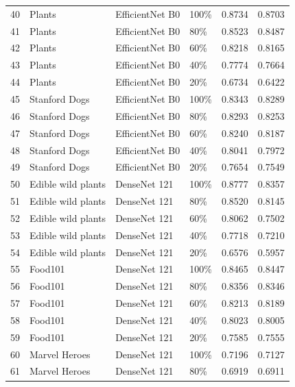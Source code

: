 \begin{longtable}{|l|l|l|l|r|r|}
40 &     Plants &  EfficientNet B0 &       100\% &  0.8734 &  0.8703 \\
41 &     Plants &  EfficientNet B0 &        80\% &  0.8523 &  0.8487 \\
42 &     Plants &  EfficientNet B0 &        60\% &  0.8218 &  0.8165 \\
43 &     Plants &  EfficientNet B0 &        40\% &  0.7774 &  0.7664 \\
44 &     Plants &  EfficientNet B0 &        20\% &  0.6734 &  0.6422 \\\hline
45 &  Stanford Dogs &  EfficientNet B0 &       100\% &  0.8343 &  0.8289 \\
46 &  Stanford Dogs &  EfficientNet B0 &        80\% &  0.8293 &  0.8253 \\
47 &  Stanford Dogs &  EfficientNet B0 &        60\% &  0.8240 &  0.8187 \\
48 &  Stanford Dogs &  EfficientNet B0 &        40\% &  0.8041 &  0.7972 \\
49 &  Stanford Dogs &  EfficientNet B0 &        20\% &  0.7654 &  0.7549 \\\hline
50 &  Edible wild plants &      DenseNet 121 &       100\% &  0.8777 &  0.8357 \\
51 &  Edible wild plants &      DenseNet 121 &        80\% &  0.8520 &  0.8145 \\
52 &  Edible wild plants &      DenseNet 121 &        60\% &  0.8062 &  0.7502 \\
53 &  Edible wild plants &      DenseNet 121 &        40\% &  0.7718 &  0.7210 \\
54 &  Edible wild plants &      DenseNet 121 &        20\% &  0.6576 &  0.5957 \\\hline
55 &        Food101 &      DenseNet 121 &       100\% &  0.8465 &  0.8447 \\
56 &        Food101 &      DenseNet 121 &        80\% &  0.8356 &  0.8346 \\
57 &        Food101 &      DenseNet 121 &        60\% &  0.8213 &  0.8189 \\
58 &        Food101 &      DenseNet 121 &        40\% &  0.8023 &  0.8005 \\
59 &        Food101 &      DenseNet 121 &        20\% &  0.7585 &  0.7555 \\\hline
60 &         Marvel Heroes &      DenseNet 121 &       100\% &  0.7196 &  0.7127 \\
61 &         Marvel Heroes &      DenseNet 121 &        80\% &  0.6919 &  0.6911 \\

\end{longtable}
